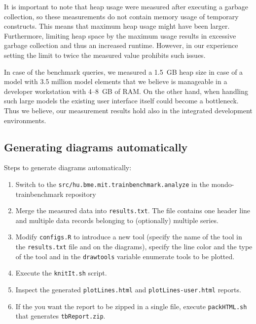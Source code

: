 It is important to note that heap usage were measured after executing a garbage
collection, so these measurements do not contain memory usage of temporary
constructs. This means that maximum heap usage might have been larger. Furthermore,
limiting heap space by the maximum usage results in excessive garbage collection
and thus an increased runtime. However, in our experience setting the limit to
twice the measured value prohibits such issues.

In case of the benchmark queries, we measured a 1.5~GB heap size in case of a
model with 3.5 million model elements that we believe is manageable in a developer
workstation with 4--8~GB of RAM. On the other hand, when handling such large
models the existing user interface itself could become a bottleneck. Thus we
believe, our measurement results hold also in the integrated development
environments.


\subsection{Generating diagrams automatically}
Steps to generate diagrams automatically:
\begin{enumerate}
  \item Switch to the \texttt{src/hu.bme.mit.trainbenchmark.analyze} in the mondo-trainbenchmark repository
  \item Merge the measured data into \texttt{results.txt}. The file contains one header line and multiple data records belonging to (optionally) multiple series.
  \item Modify \texttt{configs.R} to introduce a new tool (specify the name of the tool in the \texttt{results.txt} file and on the diagrams), specify the line color and the type of the tool and in the \texttt{drawtools} variable enumerate tools to be plotted.
  \item Execute the \texttt{knitIt.sh} script.
  \item Inspect the generated \texttt{plotLines.html} and \texttt{plotLines-user.html} reports.
  \item If the you want the report to be zipped in a single file, execute \texttt{packHTML.sh} that generates \texttt{tbReport.zip}.
\end{enumerate}

